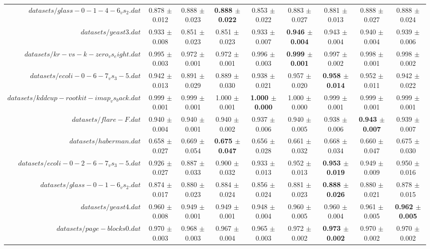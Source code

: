 \begin{table}[!ht]
{\begin{tabular}{r c c c c c c c c}
$datasets/glass-0-1-4-6_vs_2.dat$ & 0.878 $\pm$ 0.012 & 0.888 $\pm$ 0.023 & \textbf{0.888 $\pm$ 0.022} & 0.853 $\pm$ 0.022 & 0.883 $\pm$ 0.027 & 0.881 $\pm$ 0.013 & 0.888 $\pm$ 0.027 & 0.888 $\pm$ 0.024 \\
$datasets/yeast3.dat$ & 0.933 $\pm$ 0.008 & 0.851 $\pm$ 0.023 & 0.851 $\pm$ 0.023 & 0.933 $\pm$ 0.007 & \textbf{0.946 $\pm$ 0.004} & 0.943 $\pm$ 0.004 & 0.940 $\pm$ 0.004 & 0.939 $\pm$ 0.006 \\
$datasets/kr-vs-k-zero_vs_eight.dat$ & 0.995 $\pm$ 0.003 & 0.972 $\pm$ 0.001 & 0.972 $\pm$ 0.001 & 0.996 $\pm$ 0.003 & \textbf{0.999 $\pm$ 0.001} & 0.997 $\pm$ 0.002 & 0.998 $\pm$ 0.001 & 0.998 $\pm$ 0.002 \\
$datasets/ecoli-0-6-7_vs_3-5.dat$ & 0.942 $\pm$ 0.013 & 0.891 $\pm$ 0.029 & 0.889 $\pm$ 0.030 & 0.938 $\pm$ 0.021 & 0.957 $\pm$ 0.020 & \textbf{0.958 $\pm$ 0.014} & 0.952 $\pm$ 0.011 & 0.942 $\pm$ 0.022 \\
$datasets/kddcup-rootkit-imap_vs_back.dat$ & 0.999 $\pm$ 0.001 & 0.999 $\pm$ 0.001 & 1.000 $\pm$ 0.001 & \textbf{1.000 $\pm$ 0.000} & 1.000 $\pm$ 0.000 & 0.999 $\pm$ 0.001 & 0.999 $\pm$ 0.001 & 0.999 $\pm$ 0.001 \\
$datasets/flare-F.dat$ & 0.940 $\pm$ 0.004 & 0.940 $\pm$ 0.001 & 0.940 $\pm$ 0.002 & 0.937 $\pm$ 0.006 & 0.940 $\pm$ 0.005 & 0.938 $\pm$ 0.006 & \textbf{0.943 $\pm$ 0.007} & 0.939 $\pm$ 0.007 \\
$datasets/haberman.dat$ & 0.658 $\pm$ 0.027 & 0.669 $\pm$ 0.054 & \textbf{0.675 $\pm$ 0.047} & 0.656 $\pm$ 0.028 & 0.661 $\pm$ 0.032 & 0.668 $\pm$ 0.034 & 0.660 $\pm$ 0.047 & 0.675 $\pm$ 0.030 \\
$datasets/ecoli-0-2-6-7_vs_3-5.dat$ & 0.926 $\pm$ 0.027 & 0.887 $\pm$ 0.033 & 0.900 $\pm$ 0.032 & 0.933 $\pm$ 0.013 & 0.952 $\pm$ 0.013 & \textbf{0.953 $\pm$ 0.019} & 0.949 $\pm$ 0.009 & 0.950 $\pm$ 0.016 \\
$datasets/glass-0-1-6_vs_2.dat$ & 0.874 $\pm$ 0.017 & 0.880 $\pm$ 0.023 & 0.884 $\pm$ 0.024 & 0.856 $\pm$ 0.024 & 0.881 $\pm$ 0.023 & \textbf{0.888 $\pm$ 0.026} & 0.880 $\pm$ 0.021 & 0.878 $\pm$ 0.015 \\
$datasets/yeast4.dat$ & 0.960 $\pm$ 0.008 & 0.949 $\pm$ 0.001 & 0.949 $\pm$ 0.001 & 0.948 $\pm$ 0.004 & 0.960 $\pm$ 0.005 & 0.960 $\pm$ 0.004 & 0.961 $\pm$ 0.005 & \textbf{0.962 $\pm$ 0.005} \\
$datasets/page-blocks0.dat$ & 0.970 $\pm$ 0.003 & 0.968 $\pm$ 0.003 & 0.967 $\pm$ 0.004 & 0.965 $\pm$ 0.003 & 0.972 $\pm$ 0.002 & \textbf{0.973 $\pm$ 0.002} & 0.970 $\pm$ 0.002 & 0.970 $\pm$ 0.002 \\

\end{tabular}}
\end{table}
